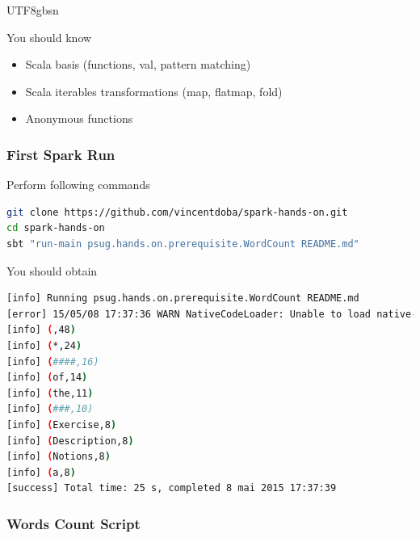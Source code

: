 \documentclass[slidetop,9pt,utf8]{beamer}
\begin{document}
\begin{CJK}{UTF8}{gbsn}
\begin{frame}
  \begin{block}{You should know}
    \begin{itemize}
      \item Scala basis (functions, val, pattern matching)
      \item Scala iterables transformations (map, flatmap, fold)
      \item Anonymous functions
    \end{itemize}
  \end{block}

\end{frame}

\begin{frame}[fragile]
  \frametitle{First Spark Run}

  \begin{block}{Perform following commands}
    \begin{lstlisting}[language=bash, style=terminal-medium]
git clone https://github.com/vincentdoba/spark-hands-on.git
cd spark-hands-on
sbt "run-main psug.hands.on.prerequisite.WordCount README.md" 
    \end{lstlisting}
  \end{block}

  \begin{block}{You should obtain}
    \begin{lstlisting}[language=bash, style=terminal]
[info] Running psug.hands.on.prerequisite.WordCount README.md
[error] 15/05/08 17:37:36 WARN NativeCodeLoader: Unable to load native-hadoop library for your platform... using builtin-java classes where applicable
[info] (,48)
[info] (*,24)
[info] (####,16)
[info] (of,14)
[info] (the,11)
[info] (###,10)
[info] (Exercise,8)
[info] (Description,8)
[info] (Notions,8)
[info] (a,8)
[success] Total time: 25 s, completed 8 mai 2015 17:37:39
    \end{lstlisting}
  \end{block}

\end{frame}

\begin{frame}[fragile]
  \frametitle{Words Count Script}

  

\end{frame}


\end{CJK}
\end{document}
